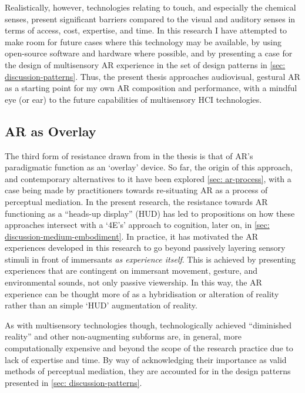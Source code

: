 Realistically, however, technologies relating to touch, and especially the chemical senses, present significant barriers compared to the visual and auditory senses in terms of access, cost, expertise, and time. In this research I have attempted to make room for future cases where this technology may be available, by using open-source software and hardware where possible, and by presenting a case for the design of multisensory AR experience in the set of design patterns in \autoref{sec: discussion-patterns}. Thus, the present thesis approaches audiovisual, gestural AR as a starting point for my own AR composition and performance, with a mindful eye (or ear) to the future capabilities of multisensory HCI technologies.

\subsection{AR as Overlay} \label{sec: method-resistance-overlay}
The third form of resistance drawn from in the thesis is that of AR's paradigmatic function as an `overlay' device. So far, the origin of this approach, and contemporary alternatives to it have been explored \autoref{sec: ar-process}, with a case being made by practitioners \citep{mann1994,schraffenberger2018,chevalier2020} towards re-situating AR as a process of perceptual mediation. In the present research, the resistance towards AR functioning as a ``heads-up display'' (HUD) has led to propositions on how these approaches intersect with a `4E's' approach to cognition, later on, in \autoref{sec: discussion-medium-embodiment}. In practice, it has motivated the AR experiences developed in this research to go beyond passively layering sensory stimuli in front of immersants \textit{as experience itself}. This is achieved by presenting experiences that are contingent on immersant movement, gesture, and environmental sounds, not only passive viewership. In this way, the AR experience can be thought more of as a hybridisation or alteration of reality rather than an simple `HUD' augmentation of reality.

As with multisensory technologies though, technologically achieved ``diminished reality'' and other non-augmenting subforms are, in general, more computationally expensive and beyond the scope of the research practice due to lack of expertise and time. By way of acknowledging their importance as valid methods of perceptual mediation, they are accounted for in the design patterns presented in \autoref{sec: discussion-patterns}.



